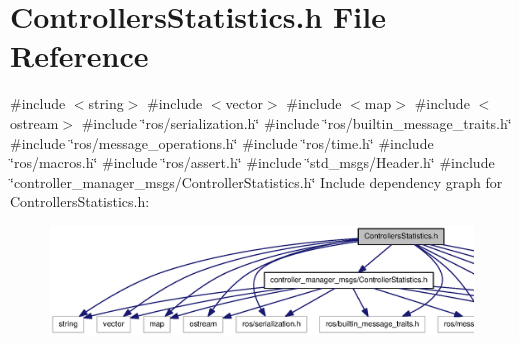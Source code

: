 \section{\-Controllers\-Statistics.\-h \-File \-Reference}
\label{ControllersStatistics_8h}
{\ttfamily \#include $<$string$>$}\*
{\ttfamily \#include $<$vector$>$}\*
{\ttfamily \#include $<$map$>$}\*
{\ttfamily \#include $<$ostream$>$}\*
{\ttfamily \#include \char`\"{}ros/serialization.\-h\char`\"{}}\*
{\ttfamily \#include \char`\"{}ros/builtin\-\_\-message\-\_\-traits.\-h\char`\"{}}\*
{\ttfamily \#include \char`\"{}ros/message\-\_\-operations.\-h\char`\"{}}\*
{\ttfamily \#include \char`\"{}ros/time.\-h\char`\"{}}\*
{\ttfamily \#include \char`\"{}ros/macros.\-h\char`\"{}}\*
{\ttfamily \#include \char`\"{}ros/assert.\-h\char`\"{}}\*
{\ttfamily \#include \char`\"{}std\-\_\-msgs/\-Header.\-h\char`\"{}}\*
{\ttfamily \#include \char`\"{}controller\-\_\-manager\-\_\-msgs/\-Controller\-Statistics.\-h\char`\"{}}\*
\-Include dependency graph for \-Controllers\-Statistics.\-h\-:
\nopagebreak
\begin{figure}[H]
\begin{center}
\leavevmode
\includegraphics[width=350pt]{ControllersStatistics_8h__incl}
\end{center}
\end{figure}
